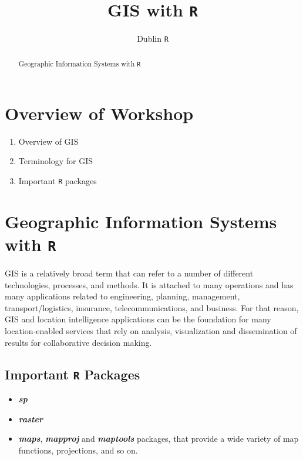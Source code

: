 \documentclass[12pt]{article}
\title{GIS with \texttt{R}}
\author{Dublin \texttt{R}}
\begin{document}
\maketitle

\begin{abstract}
Geographic Information Systems with \texttt{R}
\end{abstract}
\newpage
\section*{Overview of Workshop}
\begin{enumerate}
\item Overview of GIS
\item Terminology for GIS
\item Important \texttt{R} packages
\end{enumerate}

\newpage
\section*{Geographic Information Systems with \texttt{R}}
GIS is a relatively broad term that can refer to a number of different technologies, processes, and methods. It is attached to many operations and has many applications related to engineering, planning, management, transport/logistics, insurance, telecommunications, and business. For that reason, GIS and location intelligence applications can be the foundation for many location-enabled services that rely on analysis, visualization and dissemination of results for collaborative decision making.


\newpage
\subsection*{Important \texttt{R} Packages}

\begin{itemize}
\item \textbf{\textit{sp}}
\item \textbf{\textit{raster}}
\item  \textbf{\textit{maps}}, \textbf{\textit{mapproj}} and \textbf{\textit{maptools}} packages, that provide a wide variety of map functions, projections, and so on.
\end{itemize}
\end{document}
